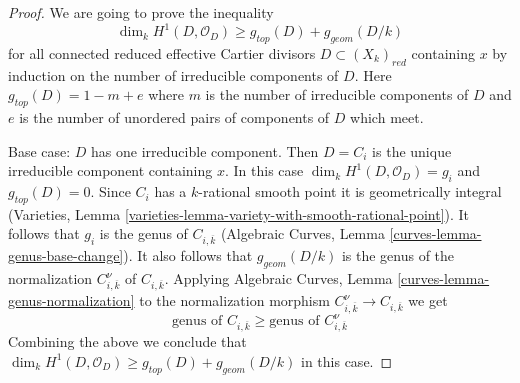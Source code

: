 \documentclass[10pt,a4paper]{amsart}
\theoremstyle{plain}
\theoremstyle{definition}
\theoremstyle{remark}
\numberwithin{equation}{subsection}
\begin{document}
\begin{proof}
We are going to prove the inequality
$$
\dim_k H^1(D, \mathcal{O}_D) \geq g_{top}(D) + g_{geom}(D/k)
$$
for all connected reduced effective Cartier divisors
$D \subset (X_k)_{red}$ containing $x$ by induction
on the number of irreducible components of $D$.
Here $g_{top}(D) = 1 - m + e$ where $m$ is the number of
irreducible components of $D$ and $e$ is the number of
unordered pairs of components of $D$ which meet.

\medskip\noindent
Base case: $D$ has one irreducible component. Then $D = C_i$
is the unique irreducible component containing $x$.
In this case $\dim_k H^1(D, \mathcal{O}_D) = g_i$
and $g_{top}(D) = 0$. Since $C_i$ has a $k$-rational smooth point
it is geometrically integral
(Varieties, Lemma \ref{varieties-lemma-variety-with-smooth-rational-point}).
It follows that $g_i$ is the genus of $C_{i, \overline{k}}$
(Algebraic Curves, Lemma \ref{curves-lemma-genus-base-change}).
It also follows that $g_{geom}(D/k)$ is the genus of the normalization
$C_{i, \overline{k}}^\nu$ of $C_{i, \overline{k}}$. Applying
Algebraic Curves, Lemma \ref{curves-lemma-genus-normalization}
to the normalization morphism $C_{i, \overline{k}}^\nu \to C_{i, \overline{k}}$
we get
\begin{equation}
\label{equation-genus-change-special-component}
\text{genus of }C_{i, \overline{k}} \geq
\text{genus of }C_{i, \overline{k}}^\nu
\end{equation}
Combining the above we conclude that
$\dim_k H^1(D, \mathcal{O}_D) \geq g_{top}(D) + g_{geom}(D/k)$
in this case.


\end{proof}
\end{document}
